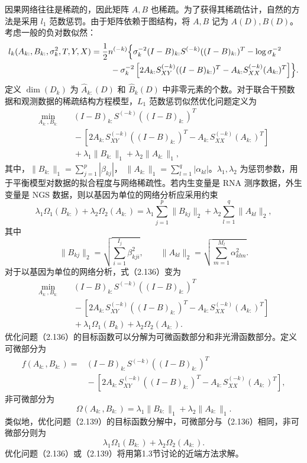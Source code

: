 因果网络往往是稀疏的，因此矩阵 $A,B$ 也稀疏。为了获得其稀疏估计，自然的方法是采用 $l_1$ 范数惩罚。由于矩阵依赖于图结构，将 $A,B$ 记为 $A(D),B(D)$。考虑一般的负对数似然：
\[
\begin{aligned}
l_k(A_{k:},B_{k:},\sigma_k^2,T,Y,X)
={}&\frac12n^{(-k)}\Bigl\{
\sigma_k^{-2}(I-B)_{k:}S^{(-k)}((I-B)_{k:})^T-\log\sigma_k^{-2}\\
&\quad-\sigma_k^{-2}
\left[2A_{k:}S_{XY}^{(-k)}((I-B)_{k:})^T
-A_{k:}S_{XX}^{(-k)}(A_{k:})^T\right]\Bigr\}.
\end{aligned}
\]
定义 $\dim(D_k)$ 为 $\widehat A_{k:}(D)$ 和 $\widehat B_k(D)$ 中非零元素的个数。对于联合干预数据和观测数据的稀疏结构方程模型，$L_1$ 范数惩罚似然优化问题定义为
\begin{equation}
\begin{aligned}
\min_{A_{k:},B_{k:}}\quad&
(I-B)_{k:}S^{(-k)}((I-B)_{k:})^T\\
&{}-\left[2A_{k:}S_{XY}^{(-k)}((I-B)_{k:})^T
-A_{k:}S_{XX}^{(-k)}(A_{k:})^T\right]\\
&{}+\lambda_1\lVert B_{k:}\rVert_1+\lambda_2\lVert A_{k:}\rVert_1,
\end{aligned}\tag{2.136}
\end{equation}
其中，$\lVert B_{k:}\rVert_1=\sum_{j=1}^{p}|\beta_{kj}|$，
$\lVert A_{k:}\rVert_1=\sum_{l=1}^{q}|\alpha_{kl}|$。$\lambda_1,\lambda_2$ 为惩罚参数，用于平衡模型对数据的拟合程度与网络稀疏性。若内生变量是 RNA 测序数据，外生变量是 NGS 数据，则以基因为单位的网络分析应采用约束
\begin{equation}
\lambda_1\Omega_1(B_{k:})+\lambda_2\Omega_2(A_{k:})
=\lambda_1\sum_{j=1}^{p}\lVert B_{kj}\rVert_2
+\lambda_2\sum_{l=1}^{q}\lVert A_{kl}\rVert_2,
\tag{2.137}
\end{equation}
其中
\begin{equation}
\lVert B_{kj}\rVert_2=
\sqrt{\sum_{i=1}^{I_j}\beta_{kji}^2},
\qquad
\lVert A_{kl}\rVert_2=
\sqrt{\sum_{m=1}^{M_l}\alpha_{klm}^2}.
\tag{2.138}
\end{equation}
对于以基因为单位的网络分析，式（2.136）变为
\begin{equation}
\begin{aligned}
\min_{A_{k:},B_{k:}}\quad&
(I-B)_{k:}S^{(-k)}((I-B)_{k:})^T\\
&{}-\left[2A_{k:}S_{XY}^{(-k)}((I-B)_{k:})^T
-A_{k:}S_{XX}^{(-k)}(A_{k:})^T\right]\\
&{}+\lambda_1\Omega_1(B_k)+\lambda_2\Omega_2(A_{k:}).
\end{aligned}\tag{2.139}
\end{equation}
优化问题（2.136）的目标函数可以分解为可微函数部分和非光滑函数部分。定义可微部分为
\[
\begin{aligned}
f(A_{k:},B_{k:})={}&(I-B)_{k:}S^{(-k)}((I-B)_{k:})^T\\
&{}-\left[2A_{k:}S_{XY}^{(-k)}((I-B)_{k:})^T
-A_{k:}S_{XX}^{(-k)}(A_{k:})^T\right],
\end{aligned}
\]
非可微部分为
\[
\Omega(A_{k:},B_{k:})=
\lambda_1\lVert B_{k:}\rVert_1+\lambda_2\lVert A_{k:}\rVert_1.
\]
类似地，优化问题（2.139）的目标函数分解中，可微部分与（2.136）相同，非可微部分则为
\[
\lambda_1\Omega_1(B_{k:})+\lambda_2\Omega_2(A_{k:}).
\]
优化问题（2.136）或（2.139）将用第1.3节讨论的近端方法求解。

